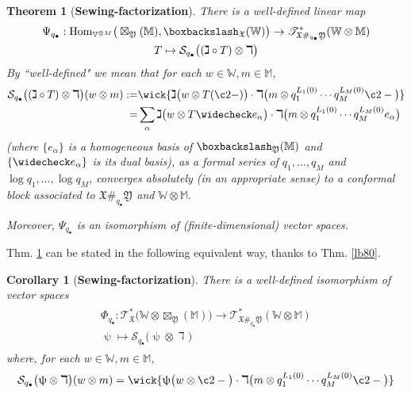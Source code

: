\documentclass[11pt,b5paper,notitlepage]{article}
\theoremstyle{definition}
\theoremstyle{plain}
\newtheorem{thm}[df]{Theorem}
\newtheorem{co}[df]{Corollary}
\newcommand{\fk}{\mathfrak}
\newcommand{\mc}{\mathcal}
\newcommand{\wch}{\widecheck}
\newcommand{\Hom}{\mathrm{Hom}}
\newcommand{\scr}{\mathscr}
\newcommand{\blt}{\bullet}
\newcommand{\Vbb}{\mathbb V}
\newcommand{\Wbb}{\mathbb W}
\newcommand{\Mbb}{\mathbb M}
\newcommand{\<}{\left\langle}
\renewcommand{\>}{\right\rangle}
\newcommand{\fx}{\mathfrak{X}}
\newcommand{\bbs}{\boxbackslash}
\numberwithin{equation}{subsection}
\begin{document}
\begin{thm}[\textbf{Sewing-factorization}]\label{lb81}
There is a well-defined linear map
\begin{gather}
\begin{gathered}
\Psi_{q_\blt}: \Hom_{\Vbb^{\otimes M}}\big(\boxtimes_{\fk Y}(\Mbb),\bbs_\fx(\Wbb)\big) \rightarrow\scr T_{\fk X\#_{q_\blt}\fk Y}^*(\Wbb\otimes\Mbb)\\
T\mapsto \mc S_{q_\blt}\big((\gimel\circ T)\otimes \daleth\big)
\end{gathered}
\end{gather}
By ``well-defined" we mean that for each $w\in\Wbb,m\in\Mbb$,
\begin{align}
\begin{aligned}
\mc S_{q_\blt}\big((\gimel\circ T)\otimes \daleth\big)(w\otimes m):=&\wick{\gimel\big(w\otimes T(\c2-)\big)\cdot \daleth\big(m\otimes q_1^{L_1(0)}\cdots q_M^{L_M(0)}\c2-\big)}\\
=&\sum_{\alpha} \gimel\big(w\otimes T\wch e_\alpha\big)\cdot \daleth\big(m\otimes q_1^{L_1(0)}\cdots q_M^{L_M(0)}e_\alpha\big)
\end{aligned}
\end{align}
(where $\{e_\alpha\}$ is a homogeneous basis of $\bbs_{\fk Y}(\Mbb)$ and $\{\wch e_\alpha\}$ is its dual basis), as a formal series of $q_1,\dots,q_M$ and $\log q_1,\dots,\log q_M$, converges absolutely (in an appropriate sense) to a conformal block associated to $\fx\#_{q_\blt}\fk Y$ and $\Wbb\otimes\Mbb$. 

Moreover, $\Psi_{q_\blt}$ is an isomorphism of (finite-dimensional) vector spaces. 
\end{thm}

Thm. \ref{lb81} can be stated in the following equivalent way, thanks to Thm. \ref{lb80}.

\begin{co}[\textbf{Sewing-factorization}]\label{lb82}
There is a well-defined isomorphism of vector spaces
\begin{gather}
\begin{gathered}
\Phi_{q_\blt}: \scr T_\fx^*\big(\Wbb\otimes\boxtimes_{\fk Y}(\Mbb)\big) \rightarrow\scr T_{\fk X\#_{q_\blt}\fk Y}^*(\Wbb\otimes\Mbb)\\
\uppsi\mapsto \mc S_{q_\blt}\big(\uppsi\otimes \daleth\big)
\end{gathered}
\end{gather}
where, for each $w\in\Wbb,m\in\Mbb$,
\begin{align}
\mc S_{q_\blt}\big(\uppsi\otimes \daleth\big)(w\otimes m)=\wick{\uppsi\big(w\otimes \c2-\big)\cdot \daleth\big(m\otimes q_1^{L_1(0)}\cdots q_M^{L_M(0)}\c2-\big)}
\end{align}
\end{co}
\end{document}
